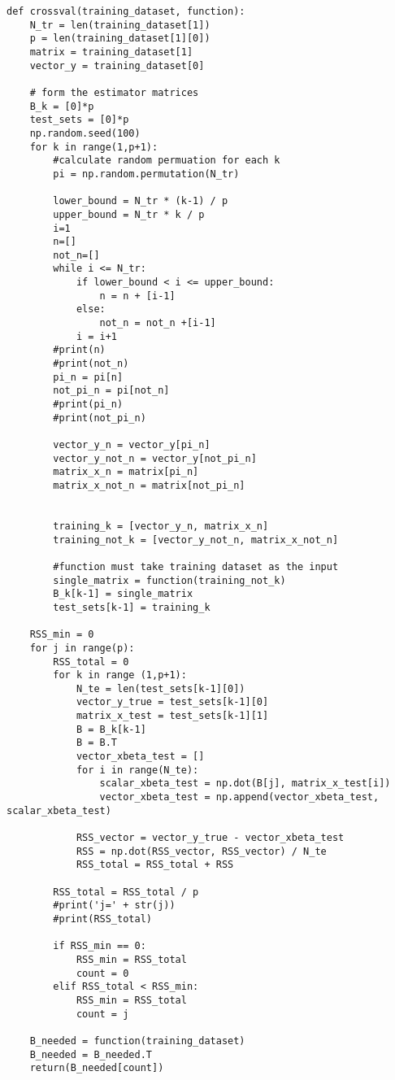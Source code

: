 \documentclass{article}
\begin{document}
\begin{lstlisting}
def crossval(training_dataset, function):
    N_tr = len(training_dataset[1])
    p = len(training_dataset[1][0])
    matrix = training_dataset[1]
    vector_y = training_dataset[0]

    # form the estimator matrices
    B_k = [0]*p
    test_sets = [0]*p
    np.random.seed(100)
    for k in range(1,p+1):
        #calculate random permuation for each k
        pi = np.random.permutation(N_tr)

        lower_bound = N_tr * (k-1) / p
        upper_bound = N_tr * k / p
        i=1
        n=[]
        not_n=[]
        while i <= N_tr:
            if lower_bound < i <= upper_bound:
                n = n + [i-1]
            else:
                not_n = not_n +[i-1]
            i = i+1
        #print(n)
        #print(not_n)
        pi_n = pi[n]
        not_pi_n = pi[not_n]
        #print(pi_n)
        #print(not_pi_n)

        vector_y_n = vector_y[pi_n]
        vector_y_not_n = vector_y[not_pi_n]
        matrix_x_n = matrix[pi_n]
        matrix_x_not_n = matrix[not_pi_n]


        training_k = [vector_y_n, matrix_x_n]
        training_not_k = [vector_y_not_n, matrix_x_not_n]

        #function must take training dataset as the input
        single_matrix = function(training_not_k)
        B_k[k-1] = single_matrix
        test_sets[k-1] = training_k

    RSS_min = 0
    for j in range(p):
        RSS_total = 0
        for k in range (1,p+1):
            N_te = len(test_sets[k-1][0])
            vector_y_true = test_sets[k-1][0]
            matrix_x_test = test_sets[k-1][1]
            B = B_k[k-1]
            B = B.T
            vector_xbeta_test = []
            for i in range(N_te):
                scalar_xbeta_test = np.dot(B[j], matrix_x_test[i])
                vector_xbeta_test = np.append(vector_xbeta_test, scalar_xbeta_test)

            RSS_vector = vector_y_true - vector_xbeta_test
            RSS = np.dot(RSS_vector, RSS_vector) / N_te
            RSS_total = RSS_total + RSS

        RSS_total = RSS_total / p
        #print('j=' + str(j))
        #print(RSS_total)

        if RSS_min == 0:
            RSS_min = RSS_total
            count = 0
        elif RSS_total < RSS_min:
            RSS_min = RSS_total
            count = j

    B_needed = function(training_dataset)
    B_needed = B_needed.T
    return(B_needed[count])
\end{lstlisting}
\end{document}
